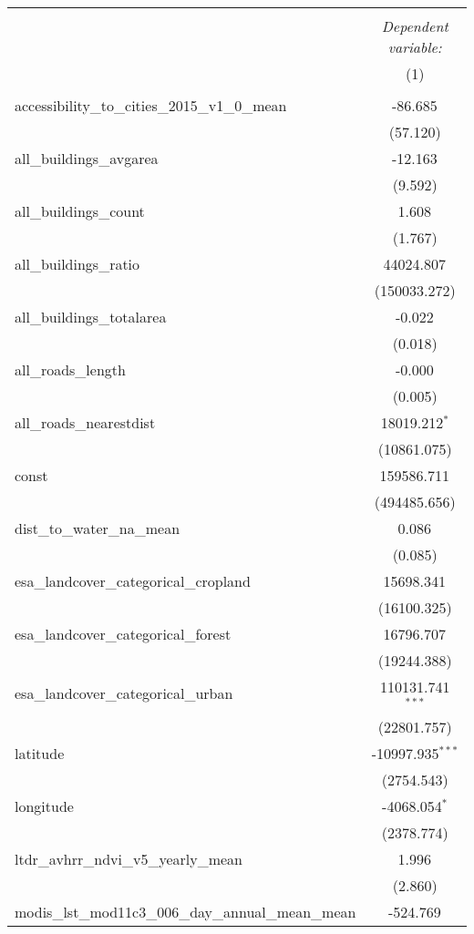 \begin{table}[!htbp] \centering
\begin{tabular}{@{\extracolsep{5pt}}lc}
\\[-1.8ex]\hline
\hline \\[-1.8ex]
& \multicolumn{1}{c}{\textit{Dependent variable:}} \
\cr \cline{1-2}
\\[-1.8ex] & (1) \\
\hline \\[-1.8ex]
 accessibility_to_cities_2015_v1_0_mean & -86.685$^{}$ \\
  & (57.120) \\
 all_buildings_avgarea & -12.163$^{}$ \\
  & (9.592) \\
 all_buildings_count & 1.608$^{}$ \\
  & (1.767) \\
 all_buildings_ratio & 44024.807$^{}$ \\
  & (150033.272) \\
 all_buildings_totalarea & -0.022$^{}$ \\
  & (0.018) \\
 all_roads_length & -0.000$^{}$ \\
  & (0.005) \\
 all_roads_nearestdist & 18019.212$^{*}$ \\
  & (10861.075) \\
 const & 159586.711$^{}$ \\
  & (494485.656) \\
 dist_to_water_na_mean & 0.086$^{}$ \\
  & (0.085) \\
 esa_landcover_categorical_cropland & 15698.341$^{}$ \\
  & (16100.325) \\
 esa_landcover_categorical_forest & 16796.707$^{}$ \\
  & (19244.388) \\
 esa_landcover_categorical_urban & 110131.741$^{***}$ \\
  & (22801.757) \\
 latitude & -10997.935$^{***}$ \\
  & (2754.543) \\
 longitude & -4068.054$^{*}$ \\
  & (2378.774) \\
 ltdr_avhrr_ndvi_v5_yearly_mean & 1.996$^{}$ \\
  & (2.860) \\
 modis_lst_mod11c3_006_day_annual_mean_mean & -524.769$^{}$ \\

\end{tabular}
\end{table}
